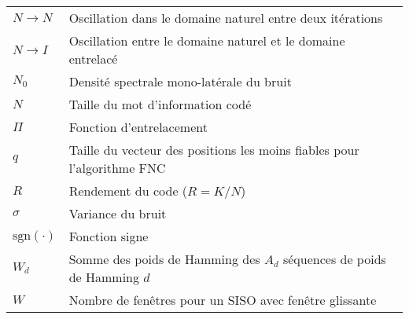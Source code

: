 \begin{center}
\begin{longtable}{ p{}  p{} }
$N	\rightarrow N$ 		&	Oscillation dans le domaine naturel entre deux itérations								\\
$N	\rightarrow I$ 		&	Oscillation entre le domaine naturel et le domaine entrelacé							\\
$N_0$    	 			&	Densité spectrale mono-latérale du bruit    											\\
$N$     	 			& 	Taille du mot d'information codé      													\\
$\Pi$					& 	Fonction d'entrelacement																\\
$q$      	        	&   Taille du vecteur des positions les moins fiables pour l'algorithme FNC 				\\
$R$     	 			&	Rendement du code ($R=K/N$)       														\\
$\sigma$				&   Variance du bruit																		\\
$\text{sgn}(\cdot)$    	&	Fonction signe																			\\
$W_d$       	 		&	Somme des poids de Hamming des $A_d$ séquences de poids de Hamming $d$ 					\\
$W$       	       		&	Nombre de fenêtres pour un SISO avec fenêtre glissante        							\\



\end{longtable}

\end{center}

